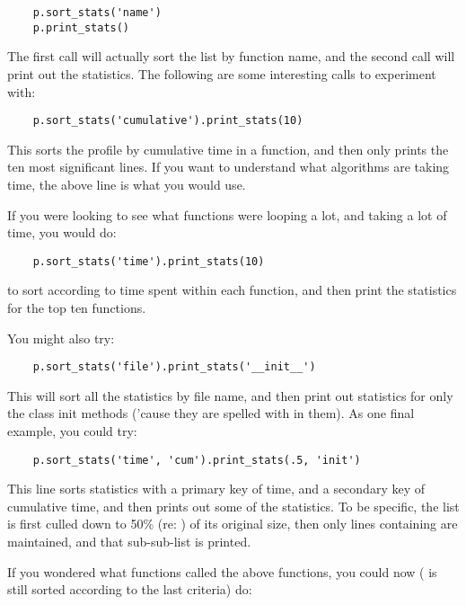 \begin{verbatim}
    p.sort_stats('name')
    p.print_stats()
\end{verbatim}

The first call will actually sort the list by function name, and the
second call will print out the statistics.  The following are some
interesting calls to experiment with:

\begin{verbatim}
    p.sort_stats('cumulative').print_stats(10)
\end{verbatim}

This sorts the profile by cumulative time in a function, and then only
prints the ten most significant lines.  If you want to understand what
algorithms are taking time, the above line is what you would use.

If you were looking to see what functions were looping a lot, and
taking a lot of time, you would do:

\begin{verbatim}
    p.sort_stats('time').print_stats(10)
\end{verbatim}

to sort according to time spent within each function, and then print
the statistics for the top ten functions.

You might also try:

\begin{verbatim}
    p.sort_stats('file').print_stats('__init__')
\end{verbatim}

This will sort all the statistics by file name, and then print out
statistics for only the class init methods ('cause they are spelled
with  in them).  As one final example, you could try:

\begin{verbatim}
    p.sort_stats('time', 'cum').print_stats(.5, 'init')
\end{verbatim}

This line sorts statistics with a primary key of time, and a secondary
key of cumulative time, and then prints out some of the statistics.
To be specific, the list is first culled down to 50\% (re: )
of its original size, then only lines containing  are
maintained, and that sub-sub-list is printed.

If you wondered what functions called the above functions, you could
now ( is still sorted according to the last criteria) do:

